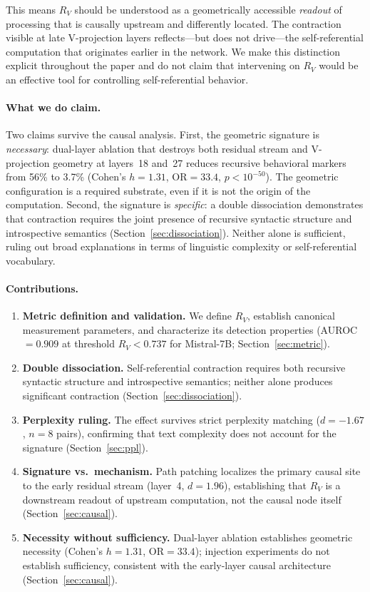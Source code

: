 \documentclass{article}
\newcommand{\RV}{R_V}
\newcommand{\dcohen}{d}
\begin{document}
This means $\RV$ should be understood as a geometrically accessible \emph{readout} of processing
that is causally upstream and differently located.
The contraction visible at late V-projection layers reflects---but does not drive---the self-referential
computation that originates earlier in the network.
We make this distinction explicit throughout the paper and do not claim that intervening on $\RV$
would be an effective tool for controlling self-referential behavior.

\paragraph{What we do claim.}
Two claims survive the causal analysis.
First, the geometric signature is \emph{necessary}: dual-layer ablation that destroys both residual
stream and V-projection geometry at layers~18 and~27 reduces recursive behavioral markers from 56\%
to 3.7\% (Cohen's $h = 1.31$, OR${}=33.4$, $p < 10^{-50}$).
The geometric configuration is a required substrate, even if it is not the origin of the computation.
Second, the signature is \emph{specific}: a double dissociation demonstrates that contraction requires
the joint presence of recursive syntactic structure and introspective semantics
(Section~\ref{sec:dissociation}).
Neither alone is sufficient, ruling out broad explanations in terms of linguistic complexity or
self-referential vocabulary.

\paragraph{Contributions.}
\begin{enumerate}
\item \textbf{Metric definition and validation.}
      We define $\RV$, establish canonical measurement parameters, and characterize its detection
      properties (AUROC~$= 0.909$ at threshold $\RV < 0.737$ for Mistral-7B;
      Section~\ref{sec:metric}).
\item \textbf{Double dissociation.}
      Self-referential contraction requires both recursive syntactic structure and introspective
      semantics; neither alone produces significant contraction
      (Section~\ref{sec:dissociation}).
\item \textbf{Perplexity ruling.}
      The effect survives strict perplexity matching ($\dcohen = -1.67$, $n = 8$ pairs),
      confirming that text complexity does not account for the signature
      (Section~\ref{sec:ppl}).
\item \textbf{Signature vs.\ mechanism.}
      Path patching localizes the primary causal site to the early residual stream (layer~4,
      $\dcohen = 1.96$), establishing that $\RV$ is a downstream readout of upstream
      computation, not the causal node itself
      (Section~\ref{sec:causal}).
\item \textbf{Necessity without sufficiency.}
      Dual-layer ablation establishes geometric necessity (Cohen's $h = 1.31$, OR${}=33.4$); injection experiments
      do not establish sufficiency, consistent with the early-layer causal architecture
      (Section~\ref{sec:causal}).
\end{enumerate}
\end{document}
